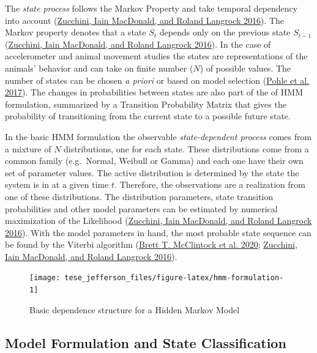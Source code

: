 \documentclass[english,msc,numbers,hidelinks]{coppe}
\begin{document}
  The \emph{state process} follows the Markov Property and take temporal dependency into account (\protect\hyperlink{ref-zucchini2016}{Zucchini, Iain MacDonald, and Roland Langrock 2016}). The Markov property denotes that a state \(S_t\) depends only on the previous state \(S_{t-1}\) (\protect\hyperlink{ref-zucchini2016}{Zucchini, Iain MacDonald, and Roland Langrock 2016}). In the case of accelerometer and animal movement studies the states are representations of the animals' behavior and can take on finite number (\(N\)) of possible values. The number of states can be chosen \emph{a priori} or based on model selection (\protect\hyperlink{ref-pohle2017}{Pohle et al. 2017}). The changes in probabilities between states are also part of the of HMM formulation, summarized by a Transition Probability Matrix that gives the probability of transitioning from the current state to a possible future state.

  In the basic HMM formulation the observable \emph{state-dependent process} comes from a mixture of \(N\) distributions, one for each state. These distributions come from a common family (e.g.~Normal, Weibull or Gamma) and each one have their own set of parameter values. The active distribution is determined by the state the system is in at a given time \(t\). Therefore, the observations are a realization from one of these distributions. The distribution parameters, state transition probabilities and other model parameters can be estimated by numerical maximization of the Likelihood (\protect\hyperlink{ref-zucchini2016}{Zucchini, Iain MacDonald, and Roland Langrock 2016}). With the model parameters in hand, the most probable state sequence can be found by the Viterbi algorithm (\protect\hyperlink{ref-mcclintock2020}{Brett T. McClintock et al. 2020}; \protect\hyperlink{ref-zucchini2016}{Zucchini, Iain MacDonald, and Roland Langrock 2016}).
  \begin{figure}

  {\centering \texttt{[image: tese\_jefferson\_files/figure-latex/hmm-formulation-1]} 

  }

  \caption{Basic dependence structure for a Hidden Markov Model}\label{fig:hmm-formulation}
  \end{figure}
  \hypertarget{model-formulation-and-state-classification}{%
  \subsection{Model Formulation and State Classification}\label{model-formulation-and-state-classification}}
\end{document}
